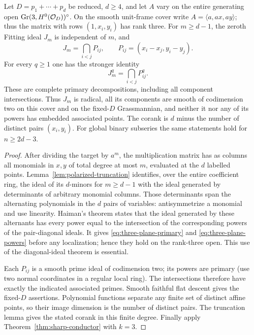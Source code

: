 \begin{theorem}
\label{thm:three-plane-primary}
Let $D=p_1+\cdots+p_d$ be reduced, $d\ge4$, and let $A$ vary on
the entire generating open $\operatorname{Gr}(3,H^0(\mathcal O_D))^\circ$.
On the smooth unit-frame cover write $A=\langle a,ax,ay\rangle$;
thus the matrix with rows $(1,x_i,y_i)$ has rank three. For $m\ge d-1$,
the zeroth Fitting ideal $J_m$ is independent of $m$, and
\begin{equation}\label{eq:three-plane-primary}
 J_m=\bigcap_{i<j}P_{ij},\qquad P_{ij}=(x_i-x_j,y_i-y_j).
\end{equation}
For every $q\ge1$ one has the stronger identity
\begin{equation}\label{eq:three-plane-powers}
 J_m^q=\bigcap_{i<j}P_{ij}^q.
\end{equation}
These are complete primary decompositions, including all component
intersections. Thus $J_m$ is radical, all its components are smooth
of codimension two on this cover and on the fixed-$D$ Grassmannian,
and neither it nor any of its powers has embedded associated points.
The corank is $d$ minus the number of distinct pairs $(x_i,y_i)$.
For global binary subseries the same statements hold for $n\ge2d-3$.
\end{theorem}
\begin{proof}
After dividing the target by $a^m$, the multiplication matrix has
as columns all monomials in $x,y$ of total degree at most $m$,
evaluated at the $d$ labelled points. Lemma~\ref{lem:polarized-truncation}
identifies, over the entire coefficient ring, the ideal of its
$d$-minors for $m\ge d-1$ with the ideal generated by determinants
of arbitrary monomial columns. Those determinants span the
alternating polynomials in the $d$ pairs of variables: antisymmetrize
a monomial and use linearity. Haiman's theorem
\cite[Corollary 3.8.3]{Haiman} states that the ideal generated by these
alternants has every power equal to the intersection of the
corresponding powers of the pair-diagonal ideals. It gives
\eqref{eq:three-plane-primary} and \eqref{eq:three-plane-powers}
before any localization; hence they hold on the rank-three open.
This use of the diagonal-ideal theorem is essential.

Each $P_{ij}$ is a smooth prime ideal of codimension two; its powers
are primary (use two normal coordinates in a regular local ring).
The intersections therefore have exactly the indicated associated
primes. Smooth faithful flat descent gives the fixed-$D$ assertions.
Polynomial functions separate any finite set of distinct affine
points, so their image dimension is the number of distinct pairs.
The truncation lemma gives the stated corank in this finite degree.
Finally apply Theorem~\ref{thm:sharp-conductor} with $k=3$.
\end{proof}

